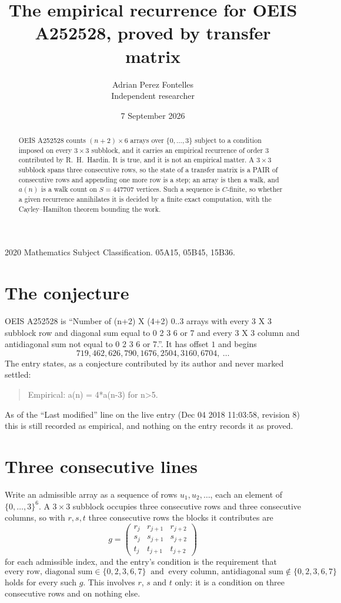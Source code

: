 \documentclass[11pt,a4paper]{article}
\title{The empirical recurrence for OEIS A252528, proved by transfer matrix}
\author{Adrian Perez Fontelles\\ \small Independent researcher}
\date{7 September 2026}
\theoremstyle{plain}
\theoremstyle{definition}
\begin{document}
\maketitle

\begin{abstract}
OEIS A252528 counts $(n+2)\times6$ arrays over $\{0,\dots,3\}$ subject to a condition imposed on
every $3\times3$ subblock, and it carries an empirical recurrence of order $3$
contributed by R.~H.~Hardin. It is true, and it is not an empirical matter. A $3\times3$
subblock spans three consecutive rows, so the state of a transfer matrix is a PAIR of
consecutive rows and appending one more row is a step; an array is then a walk, and
$a(n)$ is a walk count on $S=447707$ vertices. Such a sequence is $C$-finite, so whether a given
recurrence annihilates it is decided by a finite exact computation, with the Cayley--Hamilton
theorem bounding the work.
\end{abstract}

\noindent\small 2020 Mathematics Subject Classification. 05A15, 05B45, 15B36.\normalsize

\section{The conjecture}

OEIS A252528 is ``Number of (n+2) X (4+2) 0..3 arrays with every 3 X 3 subblock row and diagonal sum equal to 0 2 3 6 or 7 and every 3 X 3 column and antidiagonal sum not equal to 0 2 3 6 or 7.''. It has offset $1$ and begins
\[
719, 462, 626, 790, 1676, 2504, 3160, 6704,\ \dots
\]
The entry states, as a conjecture contributed by its author and never marked settled:
\begin{quote}
Empirical: a(n) = 4*a(n-3) for n>5.
\end{quote}
As of the ``Last modified'' line on the live entry (Dec 04 2018 11:03:58, revision 8) this is still
recorded as empirical, and nothing on the entry records it as proved.

\section{Three consecutive lines}

Write an admissible array as a sequence of rows $u_1,u_2,\dots$, each an element of
$\{0,\dots,3\}^{6}$. A $3\times3$ subblock occupies three consecutive rows and
three consecutive columns, so with $r,s,t$ three consecutive rows the blocks it
contributes are
\[
g=\begin{pmatrix}r_j&r_{j+1}&r_{j+2}\\ s_j&s_{j+1}&s_{j+2}\\ t_j&t_{j+1}&t_{j+2}\end{pmatrix}
\]
for each admissible index, and the entry's condition is the requirement that
\[
\text{every row, diagonal sum} \in \{0,2,3,6,7\}\ \text{ and }\ \text{every column, antidiagonal sum} \notin \{0,2,3,6,7\}
\]
holds for every such $g$. This involves $r$, $s$ and $t$ only: it is a condition on
three consecutive rows and on nothing else.
\end{document}

